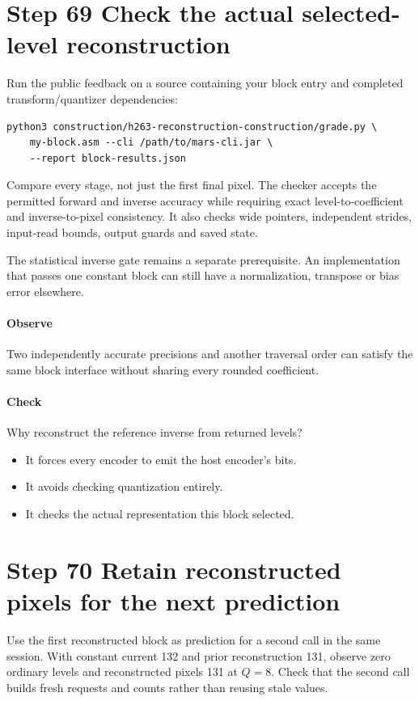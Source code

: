 \section{Step 69 Check the actual selected-level reconstruction}\label{h263-block-s09}
Run the public feedback on a source containing your block entry and completed
transform/quantizer dependencies:
\begin{verbatim}
python3 construction/h263-reconstruction-construction/grade.py \
    my-block.asm --cli /path/to/mars-cli.jar \
    --report block-results.json
\end{verbatim}
Compare every stage, not just the first final pixel. The checker accepts the
permitted forward and inverse accuracy while requiring exact level-to-coefficient
and inverse-to-pixel consistency. It also checks wide pointers, independent
strides, input-read bounds, output guards and saved state.

The statistical inverse gate remains a separate prerequisite. An implementation
that passes one constant block can still have a normalization, transpose or bias
error elsewhere.

\paragraph{Observe} Two independently accurate precisions and another traversal
order can satisfy the same block interface without sharing every rounded coefficient.
\Needspace{8\baselineskip}
\paragraph{Check} Why reconstruct the reference inverse from returned levels?
\begin{itemize}
  \item[A.] It forces every encoder to emit the host encoder's bits.
  \item[B.] It avoids checking quantization entirely.
  \item[C.] It checks the actual representation this block selected.
\end{itemize}

\section{Step 70 Retain reconstructed pixels for the next prediction}\label{h263-block-s10}
Use the first reconstructed block as prediction for a second call in the same
session. With constant current 132 and prior reconstruction 131, observe zero
ordinary levels and reconstructed pixels 131 at $Q=8$. Check that the second
call builds fresh requests and counts rather than reusing stale values.

